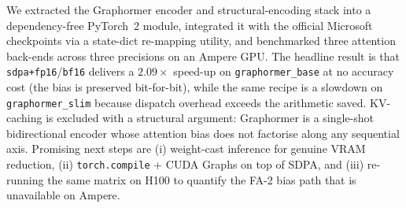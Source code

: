 \documentclass[11pt]{article}
\begin{document}
We extracted the Graphormer encoder and structural-encoding stack into a
dependency-free PyTorch~2 module, integrated it with the official
Microsoft checkpoints via a state-dict re-mapping utility, and
benchmarked three attention back-ends across three precisions on an
Ampere GPU. The headline result is that
\texttt{sdpa+fp16}/\texttt{bf16} delivers a $2.09\times$ speed-up on
\texttt{graphormer\_base} at no accuracy cost (the bias is preserved
bit-for-bit), while the same recipe is a slowdown on
\texttt{graphormer\_slim} because dispatch overhead exceeds the
arithmetic saved. KV-caching is excluded with a structural argument:
Graphormer is a single-shot bidirectional encoder whose attention bias
does not factorise along any sequential axis. Promising next steps are
(i) weight-cast inference for genuine VRAM reduction, (ii)
\texttt{torch.compile} + CUDA Graphs on top of SDPA, and (iii)
re-running the same matrix on H100 to quantify the FA-2 bias path that
is unavailable on Ampere.



\end{document}
